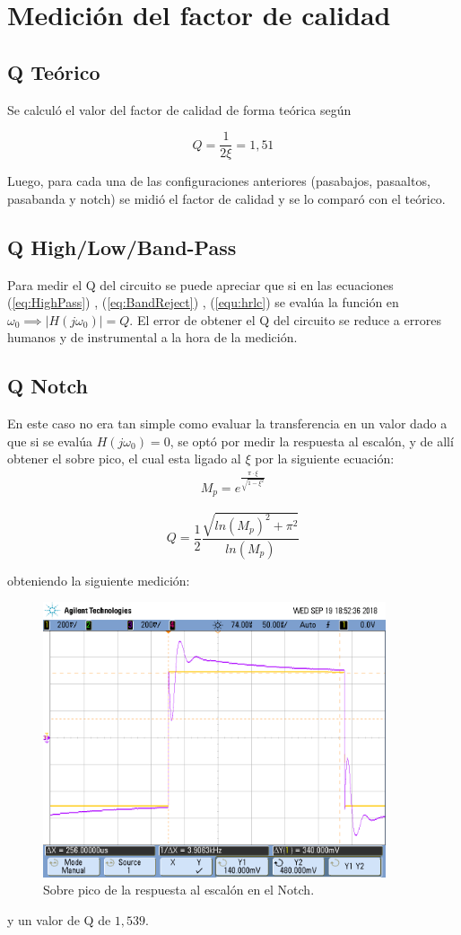 \section{Medición del factor de calidad}
\subsection{Q Teórico}
Se calculó el valor del factor de calidad de forma teórica según 

\begin{equation}
    Q=\frac{1}{2\xi}=1,51
\end{equation}

Luego, para cada una de las configuraciones anteriores (pasabajos, pasaaltos, pasabanda y notch) se midió el factor de calidad y se lo comparó con el teórico.
\subsection{Q High/Low/Band-Pass}
Para medir el Q del circuito se puede apreciar que si en las ecuaciones (\ref{eq:HighPass}) , (\ref{eq:BandReject}) , (\ref{equ:hrlc}) se evalúa la función en $\omega_0 \implies |H(j\omega_0)|=Q$. El error de obtener el Q del circuito se reduce a errores humanos y de instrumental a la hora de la medición.

\subsection{Q Notch}
En este caso no era tan simple como evaluar la transferencia en un valor dado a que si se evalúa $H(j\omega_0)=0$, se optó por medir la respuesta al escalón, y de allí obtener el sobre pico, el cual esta ligado al $\xi$ por la siguiente ecuación:
\begin{align}M_p = e^{\frac{\pi \cdot \xi}{\sqrt{1-\xi^2}}} \end{align}

\begin{equation}
Q =  \frac{1}{2} \frac{\sqrt{ln(M_p)^2 + \pi^2}}{ln(M_p)}
\end{equation}

obteniendo la siguiente medición:
\begin{figure}[H]
	\centering
	\includegraphics[width=0.9\textwidth]{Mediciones_pendrive_alan/ej4sobrepiconotch.png}
\caption{Sobre pico de la respuesta al escalón en el Notch.}
	\label{fig:Overshoot5}
\end{figure}

y un valor de Q de $1,539$.



